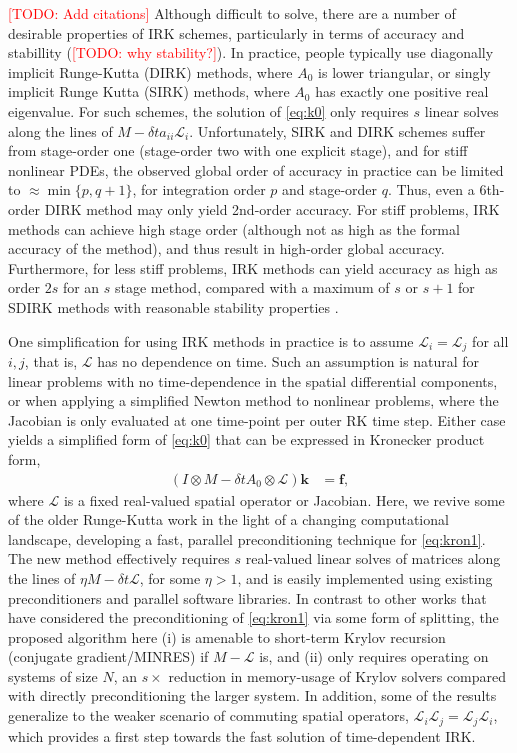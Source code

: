 \documentclass[review]{siamart}
\makeatletter
\newcommand{\todo}[1]{\textcolor{red}{[TODO\@: #1]}}
\makeatother
\begin{document}
\todo{Add citations}
Although difficult to solve, there are a number of desirable properties of IRK schemes,
particularly in terms of accuracy and stabillity (\todo{why stability?}).
In practice, people typically use
diagonally implicit Runge-Kutta (DIRK) methods, where $A_0$ is lower triangular, or
singly implicit Runge Kutta (SIRK) methods, where $A_0$ has exactly one positive real
eigenvalue. For such schemes, the solution of \eqref{eq:k0} only requires $s$ linear
solves along the lines of $M - \delta ta_{ii}\mathcal{L}_i$. Unfortunately, SIRK and DIRK
schemes suffer from stage-order one (stage-order two with one explicit stage), and for
stiff nonlinear PDEs, the observed global order of accuracy in practice can be limited to
$\approx \min\{ p, q+1\}$, for integration order $p$ and stage-order $q$. Thus, even
a 6th-order DIRK method may only yield 2nd-order accuracy. For stiff problems, IRK
methods can achieve high stage order (although not as high as the formal accuracy of
the method), and thus result in high-order global accuracy. Furthermore, for less stiff
problems, IRK methods can yield accuracy as high as order $2s$ for an $s$ stage method,
compared with a maximum of $s$ or $s+1$ for SDIRK methods with reasonable stability
properties \cite[Section IV.6]{hairer96}.

One simplification for using IRK methods in practice is to assume $\mathcal{L}_i =
\mathcal{L}_j$ for all $i,j$, that is, $\mathcal{L}$ has no dependence on time. Such
an assumption is natural for linear problems with no time-dependence in the spatial
differential components, or when applying a simplified Newton method to nonlinear
problems, where the Jacobian is only evaluated at one time-point per outer RK time
step. Either case yields a simplified form of \eqref{eq:k0} that can be expressed in
Kronecker product form,
%
\begin{align}\label{eq:kron1}
(I\otimes M - \delta t A_0\otimes \mathcal{L})\mathbf{k} & = \mathbf{f},
\end{align}
%
where $\mathcal{L}$ is a fixed real-valued spatial operator or Jacobian.
Here, we revive some of the older Runge-Kutta work in the light of a changing
computational landscape, developing a fast, parallel preconditioning technique for
\eqref{eq:kron1}. The new method effectively requires $s$ real-valued linear solves
of matrices along the lines of $\eta M - \delta t\mathcal{L}$, for some $\eta > 1$,
and is easily implemented using existing preconditioners and parallel software libraries.
In contrast to other works that have considered the preconditioning of \eqref{eq:kron1}
via some form of splitting, the proposed algorithm here (i) is amenable to short-term
Krylov recursion (conjugate gradient/MINRES) if $M - \mathcal{L}$ is, and (ii) only
requires operating on systems of size $N$, an $s\times$ reduction in memory-usage of
Krylov solvers compared with directly preconditioning the larger system. In addition,
some of the results generalize to the weaker scenario of commuting spatial operators,
$\mathcal{L}_i\mathcal{L}_j = \mathcal{L}_j\mathcal{L}_i$, which provides a first step
towards the fast solution of time-dependent IRK.
\end{document}
